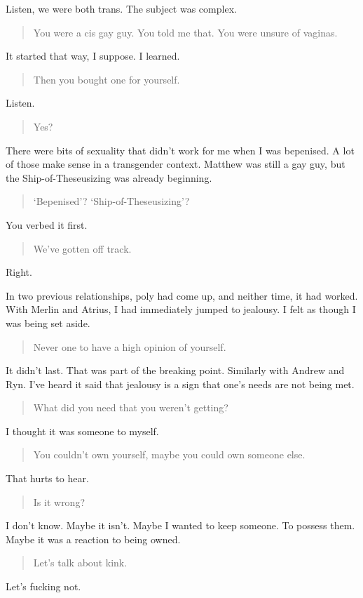 Listen, we were both trans. The subject was complex.

\begin{quote}
You were a cis gay guy. You told me that. You were unsure of vaginas.
\end{quote}

It started that way, I suppose. I learned.

\begin{quote}
Then you bought one for yourself.
\end{quote}

Listen.

\begin{quote}
Yes?
\end{quote}

There were bits of sexuality that didn't work for me when I was bepenised. A lot of those make sense in a transgender context. Matthew was still a gay guy, but the Ship-of-Theseusizing was already beginning.

\begin{quote}
`Bepenised'? `Ship-of-Theseusizing'?
\end{quote}

You verbed it first.

\begin{quote}
We've gotten off track.
\end{quote}

Right.

In two previous relationships, poly had come up, and neither time, it had worked. With Merlin and Atrius, I had immediately jumped to jealousy. I felt as though I was being set aside.

\begin{quote}
Never one to have a high opinion of yourself.
\end{quote}

It didn't last. That was part of the breaking point. Similarly with Andrew and Ryn. I've heard it said that jealousy is a sign that one's needs are not being met.

\begin{quote}
What did you need that you weren't getting?
\end{quote}

I thought it was someone to myself.

\begin{quote}
You couldn't own yourself, maybe you could own someone else.
\end{quote}

That hurts to hear.

\begin{quote}
Is it wrong?
\end{quote}

I don't know. Maybe it isn't. Maybe I wanted to keep someone. To possess them. Maybe it was a reaction to being owned.

\begin{quote}
Let's talk about kink.
\end{quote}

Let's fucking not.
